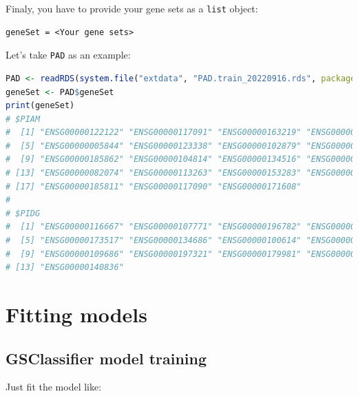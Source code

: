 \documentclass[
  12pt,
]{book}
\newcommand{\passthrough}[1]{#1}
\begin{document}
Finaly, you have to provide your gene sets as a \passthrough{\lstinline!list!} object:

\begin{lstlisting}
geneSet = <Your gene sets>
\end{lstlisting}

Let's take \passthrough{\lstinline!PAD!} as an example:

\begin{lstlisting}[language=R]
PAD <- readRDS(system.file("extdata", "PAD.train_20220916.rds", package = "GSClassifier"))
geneSet <- PAD$geneSet
print(geneSet)
# $PIAM
#  [1] "ENSG00000122122" "ENSG00000117091" "ENSG00000163219" "ENSG00000136167"
#  [5] "ENSG00000005844" "ENSG00000123338" "ENSG00000102879" "ENSG00000010671"
#  [9] "ENSG00000185862" "ENSG00000104814" "ENSG00000134516" "ENSG00000100055"
# [13] "ENSG00000082074" "ENSG00000113263" "ENSG00000153283" "ENSG00000198821"
# [17] "ENSG00000185811" "ENSG00000117090" "ENSG00000171608"
# 
# $PIDG
#  [1] "ENSG00000116667" "ENSG00000107771" "ENSG00000196782" "ENSG00000271447"
#  [5] "ENSG00000173517" "ENSG00000134686" "ENSG00000100614" "ENSG00000134247"
#  [9] "ENSG00000109686" "ENSG00000197321" "ENSG00000179981" "ENSG00000187189"
# [13] "ENSG00000140836"
\end{lstlisting}

\hypertarget{fitting-models}{%
\section{Fitting models}\label{fitting-models}}

\hypertarget{gsclassifier-model-training}{%
\subsection{GSClassifier model training}\label{gsclassifier-model-training}}

Just fit the model like:
\end{document}
